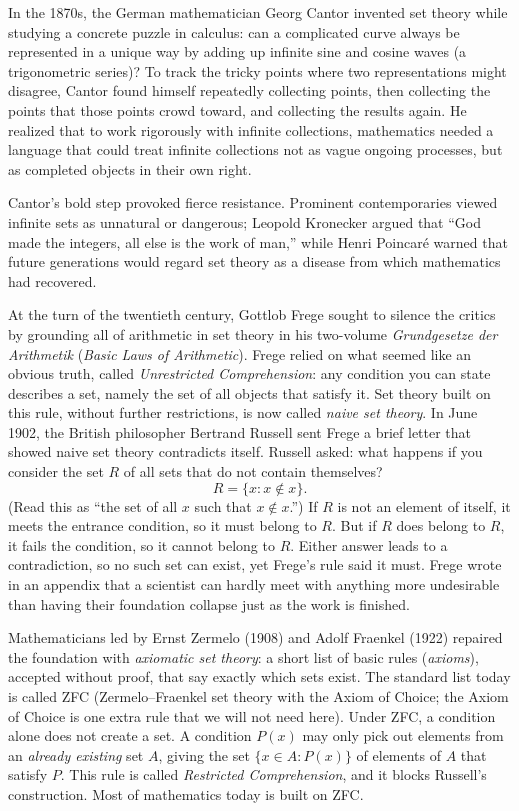 \begin{historybox}
In the 1870s, the German mathematician Georg Cantor invented set theory while studying a concrete puzzle in calculus: can a complicated curve always be represented in a unique way by adding up infinite sine and cosine waves (a trigonometric series)? To track the tricky points where two representations might disagree, Cantor found himself repeatedly collecting points, then collecting the points that those points crowd toward, and collecting the results again. He realized that to work rigorously with infinite collections, mathematics needed a language that could treat infinite collections not as vague ongoing processes, but as completed objects in their own right.

Cantor's bold step provoked fierce resistance. Prominent contemporaries viewed infinite sets as unnatural or dangerous; Leopold Kronecker argued that ``God made the integers, all else is the work of man,'' while Henri Poincar\'e warned that future generations would regard set theory as a disease from which mathematics had recovered.

At the turn of the twentieth century, Gottlob Frege sought to silence the critics by grounding all of arithmetic in set theory in his two-volume \emph{Grundgesetze der Arithmetik} (\emph{Basic Laws of Arithmetic}). Frege relied on what seemed like an obvious truth, called \emph{Unrestricted Comprehension}: any condition you can state describes a set, namely the set of all objects that satisfy it. Set theory built on this rule, without further restrictions, is now called \emph{naive set theory}. In June 1902, the British philosopher Bertrand Russell sent Frege a brief letter that showed naive set theory contradicts itself. Russell asked: what happens if you consider the set $R$ of all sets that do not contain themselves?
\[
R = \{x : x \notin x\}.
\]
(Read this as ``the set of all $x$ such that $x \notin x$.'') If $R$ is not an element of itself, it meets the entrance condition, so it must belong to $R$. But if $R$ does belong to $R$, it fails the condition, so it cannot belong to $R$. Either answer leads to a contradiction, so no such set can exist, yet Frege's rule said it must. Frege wrote in an appendix that a scientist can hardly meet with anything more undesirable than having their foundation collapse just as the work is finished.

Mathematicians led by Ernst Zermelo (1908) and Adolf Fraenkel (1922) repaired the foundation with \emph{axiomatic set theory}: a short list of basic rules (\emph{axioms}), accepted without proof, that say exactly which sets exist. The standard list today is called ZFC (Zermelo--Fraenkel set theory with the Axiom of Choice; the Axiom of Choice is one extra rule that we will not need here). Under ZFC, a condition alone does not create a set. A condition $P(x)$ may only pick out elements from an \emph{already existing} set $A$, giving the set $\{x \in A : P(x)\}$ of elements of $A$ that satisfy $P$. This rule is called \emph{Restricted Comprehension}, and it blocks Russell's construction. Most of mathematics today is built on ZFC.
\end{historybox}

